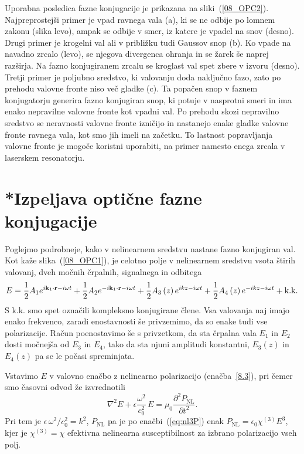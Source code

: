 Uporabna posledica fazne konjugacije je prikazana na sliki~(\ref{08_OPC2}).
Najpreprostejši primer je vpad ravnega vala (a), ki se ne odbije po lomnem zakonu (slika levo),
ampak se odbije v smer, iz katere je vpadel na snov (desno). Drugi primer je krogelni val 
ali v približku tudi Gaussov snop (b). Ko vpade na navadno zrcalo (levo), se njegova divergenca
ohranja in se žarek še naprej razširja. Na fazno konjugiranem zrcalu se kroglast val spet
zbere v izvoru (desno). Tretji primer je poljubno sredstvo, ki valovanju doda naključno
fazo, zato po prehodu valovne fronte niso več gladke (c). Ta popačen snop v faznem
konjugatorju generira fazno konjugiran snop, ki potuje v nasprotni smeri
in ima enako nepravilne valovne fronte kot vpadni val. Po prehodu
skozi nepravilno sredstvo se neravnosti valovne fronte izničijo
in nastanejo enake gladke valovne fronte ravnega vala, kot smo jih imeli na začetku. 
To lastnost popravljanja valovne fronte je mogoče 
koristni uporabiti, na primer namesto enega zrcala v laserskem resonatorju.

\section{*Izpeljava optične fazne konjugacije}
Poglejmo podrobneje, kako v nelinearnem sredstvu nastane fazno konjugiran
val. Kot kaže slika~(\ref{08_OPC1}), je celotno polje v nelinearnem
sredstvu vsota štirih valovanj, dveh močnih črpalnih, signalnega in odbitega
\begin{equation}
E=\frac{1}{2}A_{1}e^{i{\bf k}_{1}\cdot{\bf r}-i\omega t}+\frac{1}{2}A_{2}e^{-i{\bf k}_{1}\cdot{\bf r}-
i\omega t}+\frac{1}{2}A_{3}\left(z\right)e^{ikz-i\omega t}+\frac{1}{2}A_{4}
\left(z\right)e^{-ikz-i\omega t}+{\rm k.k.}
\label{8.99}
\end{equation}
S k.k. smo spet označili kompleksno konjugirane člene.  Vsa valovanja naj imajo
enako frekvenco, zaradi enostavnosti še privzemimo, da so enake tudi vse polarizacije.
Račun poenostavimo še s privzetkom, da sta črpalna vala $E_{1}$
in $E_{2}$ dosti močnejša od $E_{3}$ in $E_{4}$, tako da sta njuni
amplitudi konstantni, $E_{3}\left(z\right)$ in $E_{4}\left(z\right)$
pa se le počasi spreminjata.

Vstavimo $E$ v valovno enačbo z nelinearno polarizacijo (enačba~\ref{8.3}), pri čemer
smo časovni odvod že izvrednotili
\begin{equation}
\nabla^{2}E+\epsilon\frac{\omega^{2}}{c_0^{2}}\, 
E=\mu_{0}\frac{\partial^2 P_{\mathrm{NL}}}{\partial t^2}.
\label{8.100}
\end{equation}
Pri tem je $\epsilon\,\omega^{2}/c_0^{2}=k^{2}$, $P_{\textrm{NL}}$ pa je po enačbi~(\ref{eq:nl3P})
enak $P_\mathrm{NL}= \epsilon_{0}\chi^{(3)}E^3$, kjer je $\chi^{(3)} = \chi$
efektivna nelinearna susceptibilnost
za izbrano polarizacijo vseh polj. 

